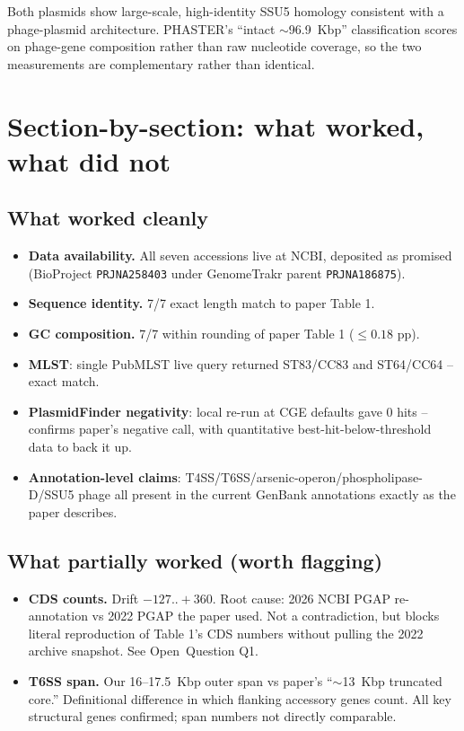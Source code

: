 \documentclass[11pt]{article}
\begin{document}
Both plasmids show large-scale, high-identity SSU5 homology consistent with a phage-plasmid
architecture. PHASTER's ``intact $\sim$96.9~Kbp'' classification scores on phage-gene composition
rather than raw nucleotide coverage, so the two measurements are complementary rather than
identical.

\section{Section-by-section: what worked, what did not}

\subsection{What worked cleanly}
\begin{itemize}
\item \textbf{Data availability.} All seven accessions live at NCBI, deposited as promised
      (BioProject \texttt{PRJNA258403} under GenomeTrakr parent \texttt{PRJNA186875}).
\item \textbf{Sequence identity.} 7/7 exact length match to paper Table 1.
\item \textbf{GC composition.} 7/7 within rounding of paper Table 1 ($\leq 0.18$ pp).
\item \textbf{MLST}: single PubMLST live query returned ST83/CC83 and ST64/CC64 -- exact match.
\item \textbf{PlasmidFinder negativity}: local re-run at CGE defaults gave 0 hits -- confirms
      paper's negative call, with quantitative best-hit-below-threshold data to back it up.
\item \textbf{Annotation-level claims}: T4SS/T6SS/arsenic-operon/phospholipase-D/SSU5 phage all
      present in the current GenBank annotations exactly as the paper describes.
\end{itemize}

\subsection{What partially worked (worth flagging)}
\begin{itemize}
\item \textbf{CDS counts.} Drift $-127..+360$. Root cause: 2026 NCBI PGAP re-annotation vs
      2022 PGAP the paper used. Not a contradiction, but blocks literal reproduction of Table 1's
      CDS numbers without pulling the 2022 archive snapshot. See Open~Question Q1.
\item \textbf{T6SS span.} Our 16--17.5~Kbp outer span vs paper's ``$\sim$13~Kbp truncated core.''
      Definitional difference in which flanking accessory genes count. All key structural genes
      confirmed; span numbers not directly comparable.
\end{itemize}
\end{document}
